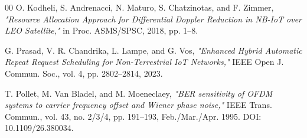 \documentclass[conference]{IEEEtran}
\begin{document}
\begin{thebibliography}{00}
 O. Kodheli, S. Andrenacci, N. Maturo, S. Chatzinotas, and F. Zimmer, \textit{"Resource Allocation Approach for Differential Doppler Reduction in NB-IoT over LEO Satellite,"} in Proc. ASMS/SPSC, 2018, pp. 1–8.

 G. Prasad, V. R. Chandrika, L. Lampe, and G. Vos, \textit{"Enhanced Hybrid Automatic Repeat Request Scheduling for Non-Terrestrial IoT Networks,"} IEEE Open J. Commun. Soc., vol. 4, pp. 2802–2814, 2023.

 T. Pollet, M. Van Bladel, and M. Moeneclaey, \textit{"BER sensitivity of OFDM systems to carrier frequency offset and Wiener phase noise,"} IEEE Trans. Commun., vol. 43, no. 2/3/4, pp. 191–193, Feb./Mar./Apr. 1995. DOI: 10.1109/26.380034.

\end{thebibliography}
\end{document}
